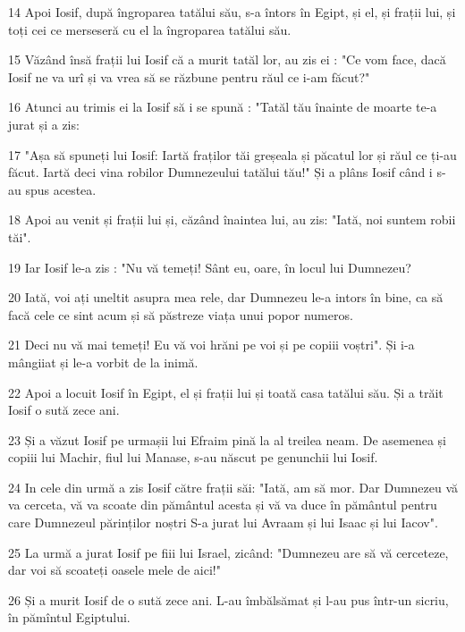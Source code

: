 \par 14 Apoi Iosif, după îngroparea tatălui său, s-a întors în Egipt, și el, și frații lui, și toți cei ce merseseră cu el la îngroparea tatălui său.
\par 15 Văzând însă frații lui Iosif că a murit tatăl lor, au zis ei : "Ce vom face, dacă Iosif ne va urî și va vrea să se răzbune pentru răul ce i-am făcut?"
\par 16 Atunci au trimis ei la Iosif să i se spună : "Tatăl tău înainte de moarte te-a jurat și a zis:
\par 17 "Așa să spuneți lui Iosif: Iartă fraților tăi greșeala și păcatul lor și răul ce ți-au făcut. Iartă deci vina robilor Dumnezeului tatălui tău!" Și a plâns Iosif când i s-au spus acestea.
\par 18 Apoi au venit și frații lui și, căzând înaintea lui, au zis: "Iată, noi suntem robii tăi".
\par 19 Iar Iosif le-a zis : "Nu vă temeți! Sânt eu, oare, în locul lui Dumnezeu?
\par 20 Iată, voi ați uneltit asupra mea rele, dar Dumnezeu le-a intors în bine, ca să facă cele ce sint acum și să păstreze viața unui popor numeros.
\par 21 Deci nu vă mai temeți! Eu vă voi hrăni pe voi și pe copiii voștri". Și i-a mângiiat și le-a vorbit de la inimă.
\par 22 Apoi a locuit Iosif în Egipt, el și frații lui și toată casa tatălui său. Și a trăit Iosif o sută zece ani.
\par 23 Și a văzut Iosif pe urmașii lui Efraim pină la al treilea neam. De asemenea și copiii lui Machir, fiul lui Manase, s-au născut pe genunchii lui Iosif.
\par 24 In cele din urmă a zis Iosif către frații săi: "Iată, am să mor. Dar Dumnezeu vă va cerceta, vă va scoate din pământul acesta și vă va duce în pământul pentru care Dumnezeul părinților noștri S-a jurat lui Avraam și lui Isaac și lui Iacov".
\par 25 La urmă a jurat Iosif pe fiii lui Israel, zicând: "Dumnezeu are să vă cerceteze, dar voi să scoateți oasele mele de aici!"
\par 26 Și a murit Iosif de o sută zece ani. L-au îmbălsămat și l-au pus într-un sicriu, în pămîntul Egiptului.

